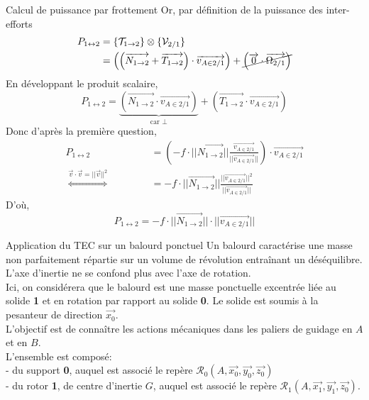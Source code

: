 \documentclass{article} %
\begin{document}
{\begin{exemple}{Calcul de puissance par frottement}
Or, par définition de la puissance des inter-efforts
\begin{align*}
P_{1 \leftrightarrow 2} &= \{\mathcal{T}_{1 \to 2}\} \otimes \{\mathcal{V}_{2/1}\}\\
&= \left(\left(\overrightarrow{N_{1 \to 2}} + \overrightarrow{T_{1 \to 2}}\right) \cdot \overrightarrow{v_{A \in 2/1}} \right) + \cancel{\left( \overrightarrow{0} \cdot \overrightarrow{\Omega_{2/1}} \right)}
\end{align*}
En développant le produit scalaire,
$$P_{1 \leftrightarrow 2} = \underbrace{\left( \overrightarrow{N_{1 \to 2}} \cdot \overrightarrow{v_{A \in 2/1}} \right)}_{\text{car $\perp$}} + \left( \overrightarrow{T_{1 \to 2}} \cdot \overrightarrow{v_{A \in 2/1}} \right)$$
Donc d'après la première question,
\begin{align*}
P_{1 \leftrightarrow 2} &= \left( - f \cdot ||\overrightarrow{N_{1 \to 2}}|| \frac{\overrightarrow{v_{A \in 2/1}}}{||\overrightarrow{v_{A \in 2/1}}||} \right) \cdot \overrightarrow{v_{A \in 2/1}}\\
\overset{\vec{v}\cdot \vec{v}=||\vec{v}||^2}{\iff}\phantom{P_{1 \leftrightarrow 2hh}} &= - f \cdot ||\overrightarrow{N_{1 \to 2}}|| \frac{||\overrightarrow{v_{A \in 2/1}}||^2}{||\overrightarrow{v_{A \in 2/1}}||}
\end{align*}
D'où,
$$\boxed{P_{1 \leftrightarrow 2} = - f \cdot ||\overrightarrow{N_{1 \to 2}}|| \cdot ||\overrightarrow{v_{A \in 2/1}}||}$$
\end{exemple}
\begin{exemple}{Application du TEC sur un balourd ponctuel}
Un balourd caractérise une masse non parfaitement répartie sur un volume de révolution entraînant un déséquilibre. L'axe d'inertie ne se confond plus avec l'axe de rotation.\\
Ici, on considérera que le balourd est une masse ponctuelle excentrée liée au solide \textbf{1} et en rotation par rapport au solide \textbf{0}. Le solide est soumis à la pesanteur de direction $\overrightarrow{x_0}$.\\
L'objectif est de connaître les actions mécaniques dans les paliers de guidage en $A$ et en $B$.\\
L'ensemble est composé:\\
\hspace*{10pt}- du support \textbf{0}, auquel est associé le repère $\mathcal{R}_0(A,\overrightarrow{x_0},\overrightarrow{y_0},\overrightarrow{z_0})$\\
\hspace*{10pt}- du rotor \textbf{1}, de centre d'inertie $G$, auquel est associé le repère $\mathcal{R}_1(A,\overrightarrow{x_1},\overrightarrow{y_1},\overrightarrow{z_0})$.\\

\end{exemple}}
\end{document}
